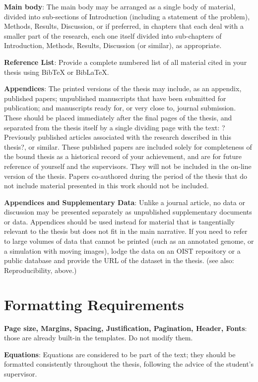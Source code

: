 \textbf{Main body}:  The main body may be arranged as a single body of material, divided into sub-sections of Introduction (including a statement of the problem), Methods, Results, Discussion, or if preferred, in chapters that each deal with a smaller part of the research, each one itself divided into sub-chapters of Introduction, Methods, Results, Discussion (or similar), as appropriate. 

\textbf{Reference List}:  Provide a complete numbered list of all material cited in your thesis using BibTeX or BibLaTeX.

\textbf{Appendices}: The printed versions of the thesis may include, as an appendix, published papers; unpublished manuscripts that have been submitted for publication; and manuscripts ready for, or very close to, journal submission.  These should be placed immediately after the final pages of the thesis, and separated from the thesis itself by a single dividing page with the text: ?Previously published articles associated with the research described in this thesis?, or similar. These published papers are included solely for completeness of the bound thesis as a historical record of your achievement, and are for future reference of yourself and the supervisors.  They will not be included in the on-line version of the thesis. Papers co-authored during the period of the thesis that do not include material presented in this work should not be included.

\textbf{Appendices and Supplementary Data}: Unlike a journal article, no data or discussion may be presented separately as unpublished supplementary documents or data.  Appendices should be used instead for material that is tangentially relevant to the thesis but does not fit in the main narrative. If you need to refer to large volumes of data that cannot be printed (such as an annotated genome, or a simulation with moving images), lodge the data on an OIST repository or a public database and provide the URL of the dataset in the thesis.  (see also: Reproducibility, above.)


\section{Formatting Requirements}

\textbf{Page size, Margins, Spacing, Justification, Pagination, Header, Fonts}: those are already built-in the templates. Do not modify them.

\textbf{Equations}: Equations are considered to be part of the text; they should be formatted consistently throughout the thesis, following the advice of the student's supervisor.  

